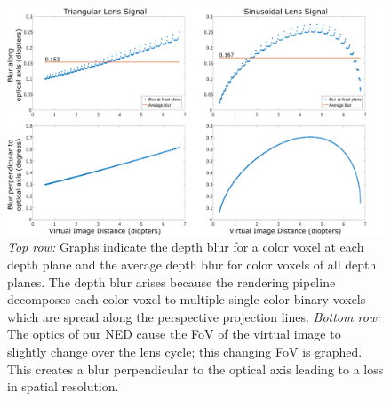 \begin{figure}[t!]
\centering
\includegraphics[width=\columnwidth]{images/volumetric/blur_graphs}
\caption[Volumetric NED: longitudinal and lateral blur of voxels at each depth plane]{\emph{Top row: }Graphs indicate the depth blur for a color voxel at each depth plane and the average depth blur for color voxels of all depth planes. The depth blur arises because the rendering pipeline decomposes each color voxel to multiple single-color binary voxels which are spread along the perspective projection lines. \emph{Bottom row: } The optics of our NED cause the FoV of the virtual image to slightly change over the lens cycle; this changing FoV is graphed. This creates a blur perpendicular to the optical axis leading to a loss in spatial resolution.}
\label{fig:volumetric:blur_graphs}
\end{figure}

